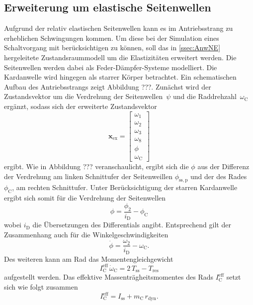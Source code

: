 \subsection{Erweiterung um elastische Seitenwellen}
Aufgrund der relativ elastischen Seitenwellen kann es im Antriebsstrang zu erheblichen Schwingungen kommen. Um diese bei der Simulation eines Schaltvorgang mit berücksichtigen zu können, soll das in \ref{ssec:AnwNE} hergeleitete Zustandsraummodell um die Elastizitäten erweitert werden. Die Seitenwellen werden dabei als Feder-Dämpfer-Systeme modelliert. Die Kardanwelle wird hingegen als starrer Körper betrachtet. Ein schematischen Aufbau des Antriebsstrangs zeigt Abbildung ???. Zunächst wird der Zustandsvektor um die Verdrehung der Seitenwellen~$\psi$ und die Raddrehzahl~$\omega_\mathrm{C}$ ergänzt, sodass sich der erweiterte Zustandsvektor
\begin{equation}
\pmb{x}_\mathrm{ex} = \begin{bmatrix} \omega_1 \\ \omega_2 \\ \omega_3 \\ \omega_8 \\ \phi \\ \omega_\mathrm{C} \end{bmatrix}
\end{equation}
ergibt. Wie in Abbildung ??? veranschaulicht, ergibt sich die $\phi$ aus der Differenz der Verdrehung am linken Schnittufer der Seitenweillen $\phi_\mathrm{ss,p}$ und der des Rades $\phi_\mathrm{C}$, am rechten Schnittufer. Unter Berücksichtigung der starren Kardanwelle ergibt sich somit für die Verdrehung der Seitenwellen
\begin{equation}
\phi = \frac{\phi_2}{i_{\mathrm{D}}} - \phi_\mathrm{C}
\end{equation}  
wobei $i_{\mathrm{D}}$ die Übersetzungen des Differentials angibt. Entsprechend gilt der Zusammenhang auch für die Winkelgeschwindigkeiten
\begin{equation}\label{eq:dynphi}
\dot{\phi} = \frac{\omega_2}{i_{\mathrm{D}}} - \omega_\mathrm{C}.
\end{equation}
Des weiteren kann am Rad das Momentengleichgewicht
\begin{equation}\label{eq:MggRad}
I^\mathrm{eff}_\mathrm{C}\,\dot{\omega}_\mathrm{C} = 2\,T_\mathrm{ss} - T_\mathrm{res}
\end{equation}
aufgestellt werden. Das effektive Massenträgheitsmomentes des Rads $I^\mathrm{eff}_\mathrm{C}$ setzt sich wie folgt zusammen
\begin{equation}
I^\mathrm{eff}_\mathrm{C} = I_\mathrm{ss} + m_\mathrm{C}\,r_\mathrm{dyn}.
\end{equation}
